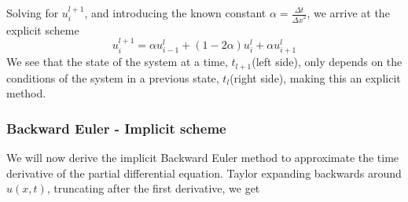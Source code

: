 \documentclass[10pt,a4paper]{article}
\newcommand{\dt}{{\Delta t}}
\newcommand{\dx}{{\Delta x}}
\begin{document}
Solving for $u_i^{l+1}$, and introducing the known constant $\alpha = \frac{\dt}{\dx^2}$, we arrive at the explicit scheme
\begin{equation}\label{eq:1dscheme:fe}
u_i^{l+1} = \alpha u_{i-1}^l + (1-2\alpha)u_i^l + \alpha u_{i+1}^l
\end{equation}
We see that the state of the system at a time, $t_{l+1}$(left side), only depends on the conditions of the system in a previous state, $t_l$(right side), making this an explicit method.


\subsubsection{Backward Euler - Implicit scheme}\label{sec:method_be}
We will now derive the implicit Backward Euler method to approximate the time derivative of the partial differential equation. Taylor expanding backwards around $u(x,t)$, truncating after the first derivative, we get
\end{document}
